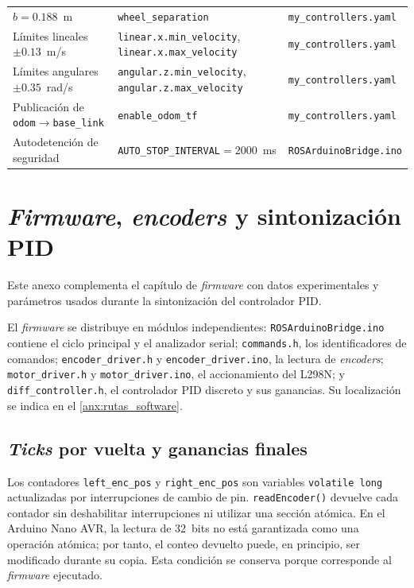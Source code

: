 \begin{appendices}
\begin{table}[H]
\begin{tabular}{p{3.5cm} p{6.3cm} p{4.1cm}}
$b=0.188$~m &
\texttt{wheel\_separation} &
\texttt{my\_controllers.yaml} \\

Límites lineales $\pm0.13$~m/s &
\texttt{linear.x.min\_velocity}, \texttt{linear.x.max\_velocity} &
\texttt{my\_controllers.yaml} \\

Límites angulares $\pm0.35$~rad/s &
\texttt{angular.z.min\_velocity}, \texttt{angular.z.max\_velocity} &
\texttt{my\_controllers.yaml} \\

Publicación de \texttt{odom}$\rightarrow$\texttt{base\_link} &
\texttt{enable\_odom\_tf} &
\texttt{my\_controllers.yaml} \\

Autodetención de seguridad &
\texttt{AUTO\_STOP\_INTERVAL}$=2000$~ms &
\texttt{ROSArduinoBridge.ino} \\
\bottomrule
\end{tabular}
\end{table}

\section{\texorpdfstring{\textit{Firmware}}{Firmware}, \texorpdfstring{\textit{encoders}}{encoders} y sintonización PID}
\label{anx:firmware}

Este anexo complementa el capítulo de \textit{firmware} con datos experimentales y parámetros usados durante la sintonización del controlador PID.

El \textit{firmware} se distribuye en módulos independientes: \texttt{ROSArduinoBridge.ino} contiene el ciclo principal y el analizador serial; \texttt{commands.h}, los identificadores de comandos; \texttt{encoder\_driver.h} y \texttt{encoder\_driver.ino}, la lectura de \textit{encoders}; \texttt{motor\_driver.h} y \texttt{motor\_driver.ino}, el accionamiento del L298N; y \texttt{diff\_controller.h}, el controlador PID discreto y sus ganancias. Su localización se indica en el \ref{anx:rutas_software}.

\subsection{\texorpdfstring{\textit{Ticks}}{Ticks} por vuelta y ganancias finales}
\label{anx:pid_data}

Los contadores \texttt{left\_enc\_pos} y
\texttt{right\_enc\_pos} son variables \texttt{volatile long} actualizadas por
interrupciones de cambio de pin. \texttt{readEncoder()} devuelve cada contador
sin deshabilitar interrupciones ni utilizar una sección atómica. En el Arduino
Nano AVR, la lectura de 32~bits no está garantizada como una operación atómica;
por tanto, el conteo devuelto puede, en principio, ser modificado durante su
copia. Esta condición se conserva porque corresponde al \textit{firmware} ejecutado.


\end{appendices}
